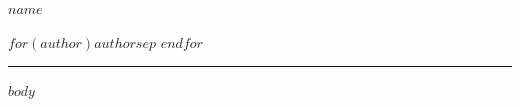 \documentclass[10pt]{article}
\begin{document}
{\LARGE\bfseries $name$}

\vspace{4pt}

{\small
$for(author)$$author$$sep$ \textbar{} $endfor$
}

\vspace{2pt}
\noindent\rule{\textwidth}{0.4pt}
\vspace{4pt}

$body$
\end{document}
